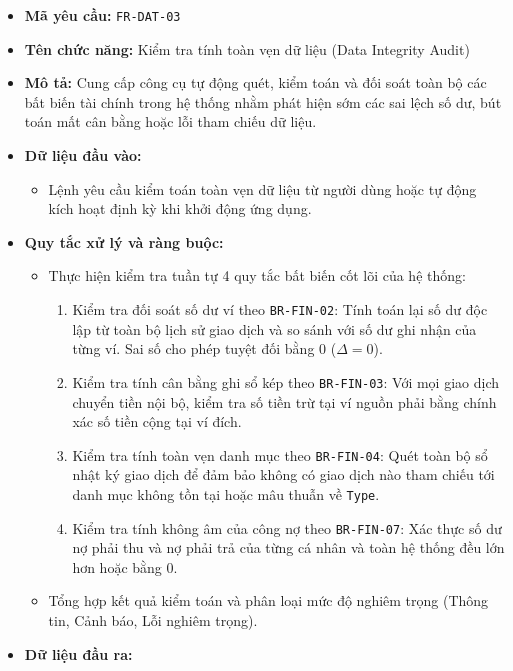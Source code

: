 \documentclass[11pt,a4paper]{article}
\providecommand{\tightlist}{
  \setlength{\itemsep}{0pt}\setlength{\parskip}{0pt}}
\begin{document}
\begin{itemize}
\tightlist
\item
  \textbf{Mã yêu cầu:} \texttt{FR-DAT-03}
\item
  \textbf{Tên chức năng:} Kiểm tra tính toàn vẹn dữ liệu (Data Integrity
  Audit)
\item
  \textbf{Mô tả:} Cung cấp công cụ tự động quét, kiểm toán và đối soát
  toàn bộ các bất biến tài chính trong hệ thống nhằm phát hiện sớm các
  sai lệch số dư, bút toán mất cân bằng hoặc lỗi tham chiếu dữ liệu.
\item
  \textbf{Dữ liệu đầu vào:}

  \begin{itemize}
  \tightlist
  \item
    Lệnh yêu cầu kiểm toán toàn vẹn dữ liệu từ người dùng hoặc tự động
    kích hoạt định kỳ khi khởi động ứng dụng.
  \end{itemize}
\item
  \textbf{Quy tắc xử lý và ràng buộc:}

  \begin{itemize}
  \tightlist
  \item
    Thực hiện kiểm tra tuần tự 4 quy tắc bất biến cốt lõi của hệ thống:

    \begin{enumerate}
    \def\labelenumi{\arabic{enumi}.}
    \tightlist
    \item
      Kiểm tra đối soát số dư ví theo \texttt{BR-FIN-02}: Tính toán lại
      số dư độc lập từ toàn bộ lịch sử giao dịch và so sánh với số dư
      ghi nhận của từng ví. Sai số cho phép tuyệt đối bằng 0
      (\(\Delta = 0\)).
    \item
      Kiểm tra tính cân bằng ghi sổ kép theo \texttt{BR-FIN-03}: Với mọi
      giao dịch chuyển tiền nội bộ, kiểm tra số tiền trừ tại ví nguồn
      phải bằng chính xác số tiền cộng tại ví đích.
    \item
      Kiểm tra tính toàn vẹn danh mục theo \texttt{BR-FIN-04}: Quét toàn
      bộ sổ nhật ký giao dịch để đảm bảo không có giao dịch nào tham
      chiếu tới danh mục không tồn tại hoặc mâu thuẫn về \texttt{Type}.
    \item
      Kiểm tra tính không âm của công nợ theo \texttt{BR-FIN-07}: Xác
      thực số dư nợ phải thu và nợ phải trả của từng cá nhân và toàn hệ
      thống đều lớn hơn hoặc bằng 0.
    \end{enumerate}
  \item
    Tổng hợp kết quả kiểm toán và phân loại mức độ nghiêm trọng (Thông
    tin, Cảnh báo, Lỗi nghiêm trọng).
  \end{itemize}
\item
  \textbf{Dữ liệu đầu ra:}


\end{itemize}
\end{document}
